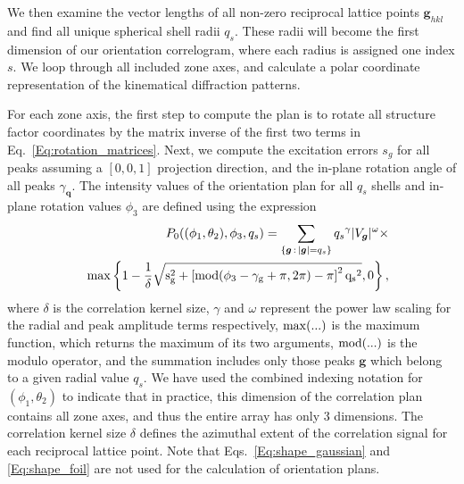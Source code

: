 \documentclass[%
 superscriptaddress,
 aip,
 amsmath,amssymb,
reprint,%
 author-year,%
longbibliography
]{revtex4-2}
\begin{document}
We then examine the vector lengths of all non-zero reciprocal lattice points $\bm{g}_{hkl}$ and find all unique spherical shell radii $q_s$. These radii will become the first dimension of our orientation correlogram, where each radius is assigned one index $s$. We loop through all included zone axes, and calculate a polar coordinate representation of the kinematical diffraction patterns. 

For each zone axis, the first step to compute the plan is to rotate all structure factor coordinates by the matrix inverse of the first two terms in Eq.~\ref{Eq:rotation_matrices}. Next, we compute the excitation errors $s_g$ for all peaks assuming a $[0,0,1]$ projection direction, and the in-plane rotation angle of all peaks $\gamma_{\bm{q}}$.  The intensity values of the orientation plan for all $q_s$ shells and in-plane rotation values $\phi_3$ are defined using the expression
\begin{eqnarray}
    && P_0((\phi_1, \theta_2), \phi_3, q_s) = 
    \sum_{ \left\{ \bm{g} \,:\, |\bm{g}| = q_s  \right\} } 
    {q_s}^\gamma |V_{\bm{g}}|^\omega \times
    \nonumber \\
    &&
    \rm{max} \left\{
        1 - \frac{1}{\delta} \sqrt{
        s_{\bm{g}}^2 + 
        \left[
        \rm{mod}(
        \phi_3 - \gamma_{\bm{g}} + \pi, 2 \pi) - \pi
        \right]^2 {q_s}^2
        }, 0
    \right\},
    \nonumber 
\end{eqnarray}
where $\delta$ is the correlation kernel size, $\gamma$ and $\omega$ represent the power law scaling for the radial and peak amplitude terms respectively, $\rm{max}(...)$ is the maximum function, which returns the maximum of its two arguments, $\rm{mod}(...)$ is the modulo operator, and the summation includes only those peaks $\bm{g}$  which belong to a given radial value $q_s$. We have used the combined indexing notation for $(\phi_1, \theta_2)$ to indicate that in practice, this dimension of the correlation plan contains all zone axes, and thus the entire array has only 3 dimensions. The correlation kernel size $\delta$ defines the azimuthal extent of the correlation signal for each reciprocal lattice point.  Note that Eqs.~\ref{Eq:shape_gaussian} and \ref{Eq:shape_foil} are not used for the calculation of orientation plans.
\end{document}
